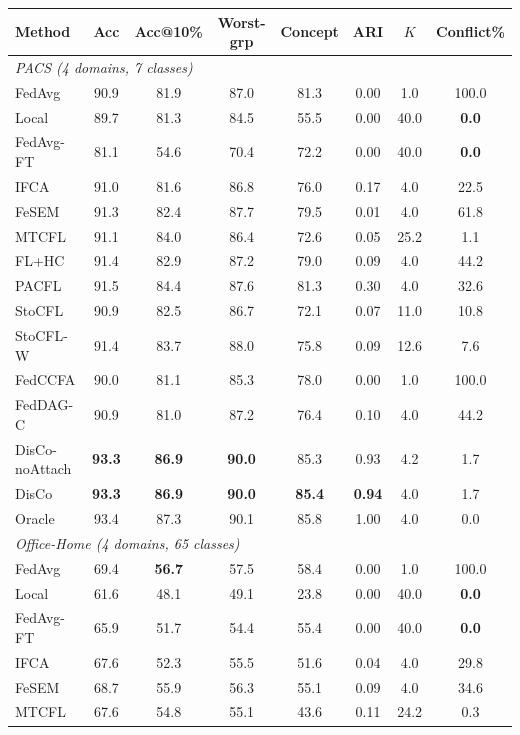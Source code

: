 \scriptsize
\setlength{\tabcolsep}{3.5pt}
\begin{tabular}{lccccccc}
\toprule
Method & Acc & Acc@10\% & Worst-grp & Concept & ARI & $K$ & Conflict\% \\
\midrule
\multicolumn{8}{l}{\textit{PACS (4 domains, 7 classes)}}\\
FedAvg & 90.9 & 81.9 & 87.0 & 81.3 & 0.00 & 1.0 & 100.0 \\
Local & 89.7 & 81.3 & 84.5 & 55.5 & 0.00 & 40.0 & \textbf{0.0} \\
FedAvg-FT & 81.1 & 54.6 & 70.4 & 72.2 & 0.00 & 40.0 & \textbf{0.0} \\
IFCA & 91.0 & 81.6 & 86.8 & 76.0 & 0.17 & 4.0 & 22.5 \\
FeSEM & 91.3 & 82.4 & 87.7 & 79.5 & 0.01 & 4.0 & 61.8 \\
MTCFL & 91.1 & 84.0 & 86.4 & 72.6 & 0.05 & 25.2 & 1.1 \\
FL+HC & 91.4 & 82.9 & 87.2 & 79.0 & 0.09 & 4.0 & 44.2 \\
PACFL & 91.5 & 84.4 & 87.6 & 81.3 & 0.30 & 4.0 & 32.6 \\
StoCFL & 90.9 & 82.5 & 86.7 & 72.1 & 0.07 & 11.0 & 10.8 \\
StoCFL-W & 91.4 & 83.7 & 88.0 & 75.8 & 0.09 & 12.6 & 7.6 \\
FedCCFA & 90.0 & 81.1 & 85.3 & 78.0 & 0.00 & 1.0 & 100.0 \\
FedDAG-C & 90.9 & 81.0 & 87.2 & 76.4 & 0.10 & 4.0 & 44.2 \\
DisCo-noAttach & \textbf{93.3} & \textbf{86.9} & \textbf{90.0} & 85.3 & 0.93 & 4.2 & 1.7 \\
DisCo & \textbf{93.3} & \textbf{86.9} & \textbf{90.0} & \textbf{85.4} & \textbf{0.94} & 4.0 & 1.7 \\
Oracle & 93.4 & 87.3 & 90.1 & 85.8 & 1.00 & 4.0 & 0.0 \\
\midrule
\multicolumn{8}{l}{\textit{Office-Home (4 domains, 65 classes)}}\\
FedAvg & 69.4 & \textbf{56.7} & 57.5 & 58.4 & 0.00 & 1.0 & 100.0 \\
Local & 61.6 & 48.1 & 49.1 & 23.8 & 0.00 & 40.0 & \textbf{0.0} \\
FedAvg-FT & 65.9 & 51.7 & 54.4 & 55.4 & 0.00 & 40.0 & \textbf{0.0} \\
IFCA & 67.6 & 52.3 & 55.5 & 51.6 & 0.04 & 4.0 & 29.8 \\
FeSEM & 68.7 & 55.9 & 56.3 & 55.1 & 0.09 & 4.0 & 34.6 \\
MTCFL & 67.6 & 54.8 & 55.1 & 43.6 & 0.11 & 24.2 & 0.3 \\

\end{tabular}
